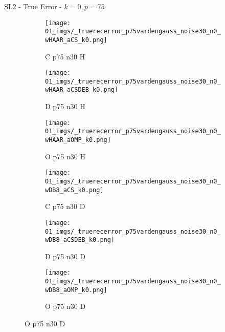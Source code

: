 \begin{frame}{SL2 - True Error - $k=0,p=75$}{}
\begin{figure}
\vspace{5pt}

\begin{subfigure}{0.13\textwidth}
\texttt{[image: 01\_imgs/\_truerecerror\_p75vardengauss\_noise30\_n0\_wHAAR\_aCS\_k0.png]}
\caption*{\tiny C p75 n30 H}
\end{subfigure}
\begin{subfigure}{0.13\textwidth}
\texttt{[image: 01\_imgs/\_truerecerror\_p75vardengauss\_noise30\_n0\_wHAAR\_aCSDEB\_k0.png]}
\caption*{\tiny D p75 n30 H}
\end{subfigure}
\begin{subfigure}{0.13\textwidth}
\texttt{[image: 01\_imgs/\_truerecerror\_p75vardengauss\_noise30\_n0\_wHAAR\_aOMP\_k0.png]}
\caption*{\tiny O p75 n30 H}
\end{subfigure}
\begin{subfigure}{0.13\textwidth}
\texttt{[image: 01\_imgs/\_truerecerror\_p75vardengauss\_noise30\_n0\_wDB8\_aCS\_k0.png]}
\caption*{\tiny C p75 n30 D}
\end{subfigure}
\begin{subfigure}{0.13\textwidth}
\texttt{[image: 01\_imgs/\_truerecerror\_p75vardengauss\_noise30\_n0\_wDB8\_aCSDEB\_k0.png]}
\caption*{\tiny D p75 n30 D}
\end{subfigure}
\begin{subfigure}{0.13\textwidth}
\texttt{[image: 01\_imgs/\_truerecerror\_p75vardengauss\_noise30\_n0\_wDB8\_aOMP\_k0.png]}
\caption*{\tiny O p75 n30 D}
\end{subfigure}
\end{figure}
\end{frame}


